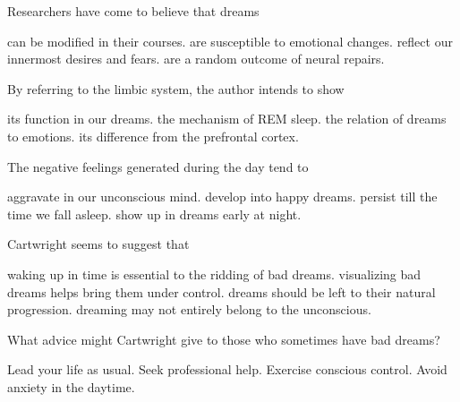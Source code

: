 \item Researchers have come to believe that dreams
\begin{tasks}
	\task can be modified in their courses.
	\task are susceptible to emotional changes.
	\task reflect our innermost desires and fears.
	\task are a random outcome of neural repairs.
\end{tasks}
\item By referring to the limbic system, the author intends to show
\begin{tasks}
	\task its function in our dreams.
	\task the mechanism of REM sleep.
	\task the relation of dreams to emotions.
	\task its difference from the prefrontal cortex.
\end{tasks}
\item The negative feelings generated during the day tend to
\begin{tasks}
	\task aggravate in our unconscious mind.
	\task develop into happy dreams.
	\task persist till the time we fall asleep.
	\task show up in dreams early at night.
\end{tasks}
\item Cartwright seems to suggest that
\begin{tasks}
	\task waking up in time is essential to the ridding of bad dreams.
	\task visualizing bad dreams helps bring them under control.
	\task dreams should be left to their natural progression.
	\task dreaming may not entirely belong to the unconscious.
\end{tasks}
\item What advice might Cartwright give to those who sometimes have bad dreams?
\begin{tasks}
	\task Lead your life as usual.
	\task Seek professional help.
	\task Exercise conscious control.
	\task Avoid anxiety in the daytime.
\end{tasks}